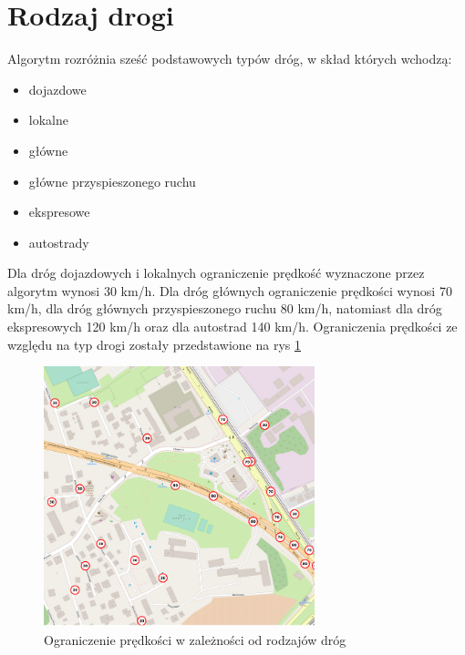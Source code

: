\newpage
\section{Rodzaj drogi}
\label{sec:typeOfRoad}
Algorytm rozróżnia sześć podstawowych typów dróg, w skład których wchodzą:
\begin{itemize}
\item dojazdowe
\item lokalne
\item główne
\item główne przyspieszonego ruchu
\item ekspresowe
\item autostrady
\end{itemize}

Dla dróg dojazdowych i lokalnych ograniczenie prędkość wyznaczone przez algorytm wynosi 30 km/h. Dla dróg głównych ograniczenie prędkości wynosi 70 km/h, dla dróg głównych przyspieszonego ruchu 80 km/h, natomiast dla dróg ekspresowych 120 km/h oraz dla autostrad 140 km/h. Ograniczenia prędkości ze względu na typ drogi zostały przedstawione na rys \ref{sec:typeOfRoad}
\begin{figure}[h]
\caption{Ograniczenie prędkości w zależności od rodzajów dróg}
\label{sec:typeOfRoad}
\centering
\includegraphics[width=0.7\textwidth]{typeOfRoad}
\end{figure}

\newpage

